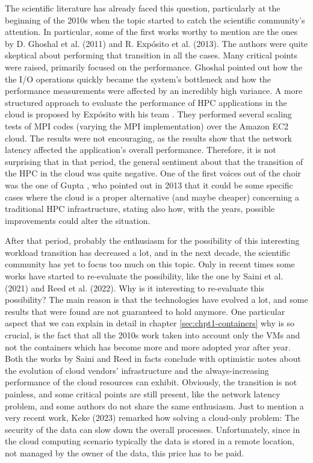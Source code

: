 The scientific literature has already faced this question, particularly at the
beginning of the 2010s when the topic started to catch the scientific
community's attention. In particular, some of the first works worthy to mention
are the ones by D. Ghoshal et al. (2011) and  R. Exp\'osito et al. (2013).
The authors were quite skeptical about performing that transition in all the
cases. Many critical points were raised, primarily focused on the performance.
Ghoshal \cite{Ghoshal2011} pointed out how the the I/O operations quickly became
the system's bottleneck and how the performance measurements were affected by an
incredibly high variance.
A more structured approach to evaluate the performance of HPC applications in
the cloud is proposed by Exp\'osito with his team \cite{exposito2013}.
They performed several scaling tests of MPI codes (varying the MPI
implementation) over the Amazon EC2 cloud. The results were not encouraging, as
the results show that the network latency affected the application's overall
performance.
Therefore, it is not surprising that in that period, the general sentiment about
that the transition of the HPC in the cloud was quite negative. One of the first
voices out of the choir was the one of Gupta \cite{Gupta2013}, who pointed out
in 2013 that it could be some specific cases where the cloud is a proper
alternative (and maybe cheaper) concerning a traditional HPC infrastructure,
stating also how, with the years, possible improvements could alter the situation.

After that period, probably the enthusiasm for the possibility of this
interesting workload transition has decreased a lot, and in the next decade, the
scientific community has yet to focus too much on this topic.
Only in recent times some works have started to re-evaluate the possibility,
like the one by Saini et al. \cite{Saini2021} (2021) and Reed et al. \cite{Reed2022}
(2022).
Why is it interesting to re-evaluate this possibility? The main reason is that
the technologies have evolved a lot, and some results that were found are not
guaranteed to hold anymore. One particular aspect that we can explain in detail
in chapter \ref{sec:chpt1-containers} why is so crucial, is the fact that all
the 2010s work taken into account only the VMs and not the containers which has
become more and more adopted year after year. Both the works by Saini and Reed
in facts conclude with optimistic notes about the evolution of cloud vendors'
infrastructure and the always-increasing performance of the cloud resources can
exhibit.
Obviously, the transition is not painless, and some critical points are still
present, like the network latency problem, and some authors do not share the
same enthusiasm.
Just to mention a very recent work, Keke \cite{Keke2023} (2023) remarked how
solving a cloud-only problem: The security of the data can slow down the
overall processes. Unfortunately, since in the cloud computing scenario
typically the data is stored in a remote location, not managed by the owner of
the data, this price has to be paid.

